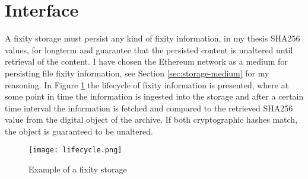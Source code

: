 \section{Interface}
A fixity storage must persist any kind of fixity information, in my thesis SHA256 values, for longterm and guarantee that the persisted content is unaltered until retrieval of the content. I have chosen the Ethereum network as a medium for persisting file fixity information, see Section \ref{sec:storage-medium} for my reasoning. In Figure \ref{fig:lifecycle} the lifecycle of fixity information is presented, where at some point in time the information is ingested into the storage and after a certain time interval the information is fetched and compared to the retrieved SHA256 value from the digital object of the archive. If both cryptographic hashes match, the object is guaranteed to be unaltered. 
\begin{figure}[b]
  \caption{Example of a fixity storage}
  \label{fig:lifecycle}
  \centering
    \texttt{[image: lifecycle.png]}
\end{figure}
